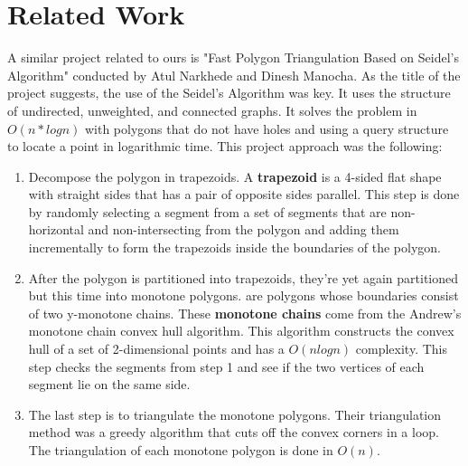 \documentclass[conference]{IEEEtran}
\begin{document}
\section{Related Work}
A similar project related to ours is "Fast Polygon Triangulation Based on Seidel's Algorithm" conducted by Atul Narkhede and Dinesh Manocha. As the title of the project suggests, the use of the Seidel's Algorithm was key. It uses the structure of undirected, unweighted, and connected graphs. It solves the problem in $O(n*logn)$ with polygons that do not have holes and using a query structure to locate a point in logarithmic time. This project approach was the following:
\begin{enumerate}
    \item Decompose the polygon in trapezoids. A \textbf{trapezoid} is a 4-sided flat shape with straight sides that has a pair of opposite sides parallel. This step is done by randomly selecting a segment from a set of segments that are non-horizontal and non-intersecting from the polygon and adding them incrementally to form the trapezoids inside the boundaries of the polygon.
    \item After the polygon is partitioned into trapezoids, they're yet again partitioned but this time into monotone polygons.  are polygons whose boundaries consist of two y-monotone chains. These \textbf{monotone chains} come from the Andrew's monotone chain convex hull algorithm. This algorithm constructs the convex hull of a set of 2-dimensional points and has a $O(nlogn)$ complexity. This step checks the segments from step 1 and see if the two vertices of each segment lie on the same side.
    \item The last step is to triangulate the monotone polygons. Their triangulation method was a greedy algorithm that cuts off the convex corners in a loop. The triangulation of each monotone polygon is done in $O(n)$.
\end{enumerate}
\cite{relatedProject}
\end{document}
